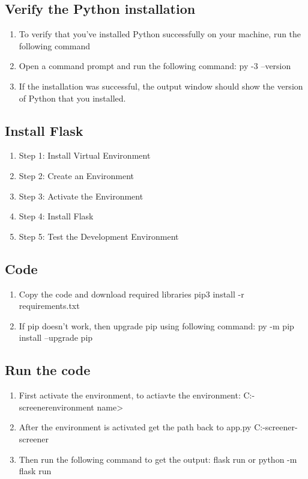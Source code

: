 \documentclass[12 pt, oneside]{book}
\begin{document}
\subsection{Verify the Python installation}
\begin{enumerate}
    \item To verify that you've installed Python successfully on your machine, run the following command
\item Open a command prompt and run the following command:
py -3 --version
\item If the installation was successful, the output window should show the version of Python that you installed.
\end{enumerate}

\subsection{Install Flask}
\begin{enumerate}
    \item Step 1: Install Virtual Environment
    \item Step 2: Create an Environment
    \item Step 3: Activate the Environment
    \item Step 4: Install Flask
    \item Step 5: Test the Development Environment
\end{enumerate}

\subsection{Code}
\begin{enumerate}
    \item Copy the code and download required libraries
pip3 install -r requirements.txt  
\item If pip doesn't work, then upgrade pip using following command:
py -m pip install --upgrade pip
\end{enumerate}

\subsection{Run the code}
\begin{enumerate}
    \item First activate the environment, to actiavte the environment:
C:\users\Documents\Source\resume-screener\<environment name>\Scripts\activate
\item After the environment is activated get the path back to app.py
C:\users\Documents\Source\resume-screener\resume-screener\app
\item Then run the following command to get the output:
flask run or python -m flask run
\end{enumerate}
\end{document}

